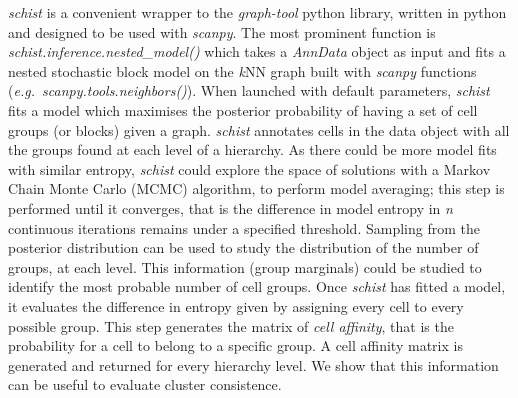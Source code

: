 \documentclass[10pt,letterpaper]{article}
\begin{document}
\emph{schist} is a convenient wrapper to the \emph{graph-tool} python library, written in python and designed to be used with \emph{scanpy}. The most prominent function is \emph{schist.inference.nested\_model()} which takes a \emph{AnnData} object as input and fits a nested stochastic block model on the \emph{k}NN graph built with \emph{scanpy} functions (\emph{e.g.\ scanpy.tools.neighbors()}). When launched with default parameters, \emph{schist} fits a model which maximises the posterior probability of having a set of cell groups (or blocks) given a graph. \emph{schist} annotates cells in the data object with all the groups found at each level of a hierarchy. As there could be more model fits with similar entropy, \emph{schist} could explore the space of solutions with a Markov Chain Monte Carlo (MCMC) algorithm, to perform model averaging; this step is performed until it converges, that is the difference in model entropy in \emph{n} continuous iterations remains under a specified threshold. Sampling from the posterior distribution can be used to study the distribution of the number of groups, at each level. This information (group marginals) could be studied to identify the most probable number of cell groups.
Once \emph{schist} has fitted a model, it evaluates the difference in entropy given by assigning every cell to every possible group. This step generates the matrix of \emph{cell affinity}, that is the probability for a cell to belong to a specific group. A cell affinity matrix is generated and returned for every hierarchy level. We show that this information can be useful to evaluate cluster consistence.


\end{document}
